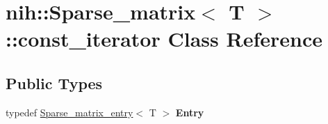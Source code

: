 \hypertarget{classnih_1_1_sparse__matrix_1_1const__iterator}{
\section{nih\-:\-:\-Sparse\-\_\-matrix$<$ \-T $>$\-:\-:const\-\_\-iterator \-Class \-Reference}
\label{classnih_1_1_sparse__matrix_1_1const__iterator}
}
\subsection*{\-Public \-Types}
\begin{DoxyCompactItemize}
\item 
\hypertarget{classnih_1_1_sparse__matrix_1_1const__iterator_a534dea126528c8aa7643dec90242d390}{
typedef \hyperlink{structnih_1_1_sparse__matrix__entry}{\-Sparse\-\_\-matrix\-\_\-entry}$<$ \-T $>$ {\bfseries \-Entry}}
\label{classnih_1_1_sparse__matrix_1_1const__iterator_a534dea126528c8aa7643dec90242d390}

\end{DoxyCompactItemize}
